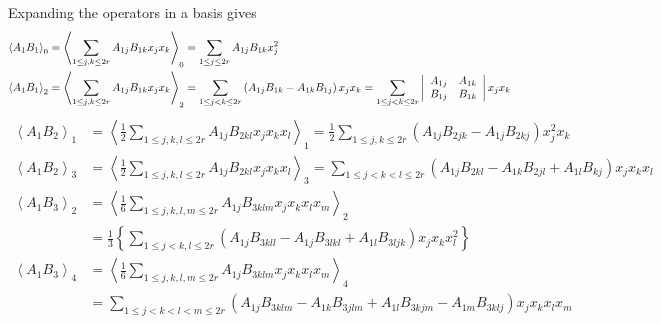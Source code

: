 \documentclass[aps,preprint]{revtex4}%
\begin{document}
Expanding the operators in a basis gives
\begin{align}
\left\langle A_{1}B_{1}\right\rangle _{0}  &  =\left\langle \sum_{1\leq
j,k\leq2r}A_{1j}B_{1k}x_{j}x_{k}\right\rangle _{0}=\sum_{1\leq j\leq2r}%
A_{1j}B_{1k}x_{j}^{2}\\
\left\langle A_{1}B_{1}\right\rangle _{2}  &  =\left\langle \sum_{1\leq
j,k\leq2r}A_{1j}B_{1k}x_{j}x_{k}\right\rangle _{2}=\sum_{1\leq j<k\leq
2r}\left(  A_{1j}B_{1k}-A_{1k}B_{1j}\right)  x_{j}x_{k}=\sum_{1\leq j<k\leq
2r}\left\vert
\begin{array}
[c]{cc}%
A_{1j} & A_{1k}\\
B_{1j} & B_{1k}%
\end{array}
\right\vert x_{j}x_{k}%
\end{align}%
\begin{align}
\left\langle A_{1}B_{2}\right\rangle _{1}  &  =\left\langle \frac{1}{2}%
\sum_{1\leq j,k,l\leq2r}A_{1j}B_{2kl}x_{j}x_{k}x_{l}\right\rangle _{1}%
=\frac{1}{2}\sum_{1\leq j,k\leq2r}\left(  A_{1j}B_{2jk}-A_{1j}B_{2kj}\right)
x_{j}^{2}x_{k}\\
\left\langle A_{1}B_{2}\right\rangle _{3}  &  =\left\langle \frac{1}{2}%
\sum_{1\leq j,k,l\leq2r}A_{1j}B_{2kl}x_{j}x_{k}x_{l}\right\rangle _{3}%
=\sum_{1\leq j<k<l\leq2r}\left(  A_{1j}B_{2kl}-A_{1k}B_{2jl}+A_{1l}%
B_{kj}\right)  x_{j}x_{k}x_{l}%
\end{align}%
\begin{align}
\left\langle A_{1}B_{3}\right\rangle _{2}  &  =\left\langle \frac{1}{6}%
\sum_{1\leq j,k,l,m\leq2r}A_{1j}B_{3klm}x_{j}x_{k}x_{l}x_{m}\right\rangle
_{2}\\
&  =\frac{1}{3}\left\{  \sum_{1\leq j<k,l\leq2r}\left(  A_{1j}B_{3kll}%
-A_{1j}B_{3lkl}+A_{1l}B_{3ljk}\right)  x_{j}x_{k}x_{l}^{2}\right\} \\
\left\langle A_{1}B_{3}\right\rangle _{4}  &  =\left\langle \frac{1}{6}%
\sum_{1\leq j,k,l,m\leq2r}A_{1j}B_{3klm}x_{j}x_{k}x_{l}x_{m}\right\rangle
_{4}\\
&  =\sum_{1\leq j<k<l<m\leq2r}\left(  A_{1j}B_{3klm}-A_{1k}B_{3jlm}%
+A_{1l}B_{3kjm}-A_{1m}B_{3klj}\right)  x_{j}x_{k}x_{l}x_{m}%
\end{align}%
\end{document}
